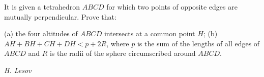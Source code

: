 It is given a tetrahedron $ABCD$ for which two points of opposite edges are mutually perpendicular. Prove that:

(a) the four altitudes of $ABCD$ intersects at a common point $H$;
(b) $AH+BH+CH+DH<p+2R$, where $p$ is the sum of the lengths of all edges of $ABCD$ and $R$ is the radii of the sphere circumscribed around $ABCD$.

\textit{H. Lesov}